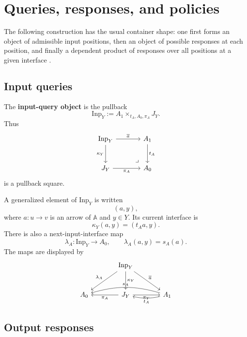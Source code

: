 \section{Queries, responses, and policies}
\label{sec:poly-relative-queries-responses}

The following construction has the usual container shape: one first forms an
object of admissible input positions, then an object of possible responses at
each position, and finally a dependent product of responses over all positions
at a given interface \cite{AbbottAltenkirchGhani2005Containers}.

\subsection{Input queries}
\label{subsec:poly-relative-input-queries}

\begin{definition}
\label{def:poly-relative-input-query-object}
The \textbf{input-query object} is the pullback
\[
\mathrm{Inp}_Y:=A_1\times_{t_A,A_0,\pi_A}J_Y.
\]
Thus
\[
\begin{tikzcd}[column sep=large,row sep=large]
\mathrm{Inp}_Y
  \arrow[r,"\overline a"]
  \arrow[d,"\kappa_Y"']
&
A_1
  \arrow[d,"t_A"]
\\
J_Y
  \arrow[r,"\pi_A"']
&
A_0
\arrow[ul,phantom,very near start,"\lrcorner"]
\end{tikzcd}
\]
is a pullback square.
\end{definition}

A generalized element of \(\mathrm{Inp}_Y\) is written
\[
(a,y),
\]
where \(a:u\to v\) is an arrow of \(\mathbb A\) and \(y\in Y\).  Its current
interface is
\[
\kappa_Y(a,y)=(t_Aa,y).
\]
There is also a next-input-interface map
\[
\lambda_A:\mathrm{Inp}_Y\to A_0,
\qquad
\lambda_A(a,y)=s_A(a).
\]
The maps are displayed by
\[
\begin{tikzcd}[column sep=large,row sep=large]
&
\mathrm{Inp}_Y
  \arrow[dl,"\lambda_A"']
  \arrow[d,"\kappa_Y"]
  \arrow[dr,"\overline a"]
&
\\
A_0
&
J_Y
  \arrow[l,"\pi_A"]
  \arrow[r,"\pi_Y"']
&
A_1
  \arrow[l,bend left=12,"t_A"]
  \arrow[ll,bend right=16,"s_A"']
\end{tikzcd}
\]

\subsection{Output responses}
\label{subsec:poly-relative-output-responses}


